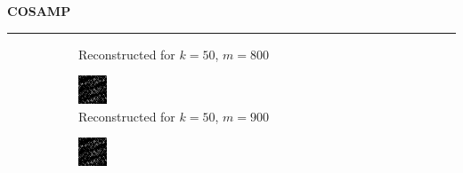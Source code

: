 \documentclass[a4paper,12pt]{article}
\newenvironment{solution}[2][]{%
    \begin{mdframed}[linecolor=blue!70!black, linewidth=2pt, roundcorner=10pt, backgroundcolor=yellow!10!white, skipabove=12pt, skipbelow=12pt]%
        \textbf{\large #2}
        \par\noindent\rule{\textwidth}{0.4pt}
}{
    \end{mdframed}
}
\begin{document}
\begin{solution}{COSAMP}
\begin{figure}[H]
\begin{subfigure}[t]{0.23\textwidth}
            \caption{Reconstructed for $k = 50$, $m = 800$}
        \end{subfigure}
        \begin{subfigure}[t]{0.23\textwidth}
            \centering
            \includegraphics[width=\textwidth]{../images/cosamp/Reconstructed_k_50_m_900.png}
            \caption{Reconstructed for $k = 50$, $m = 900$}
        \end{subfigure}
        \begin{subfigure}[t]{0.23\textwidth}
            \centering
            \includegraphics[width=\textwidth]{../images/cosamp/Reconstructed_k_50_m_1000.png}

\end{subfigure}
\end{figure}
\end{solution}
\end{document}
